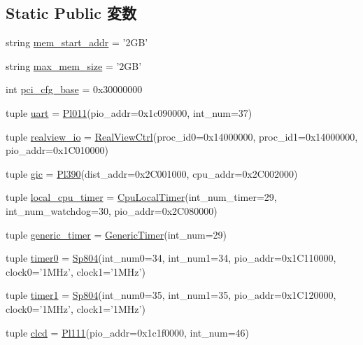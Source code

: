 \subsection*{Static Public 変数}
\begin{DoxyCompactItemize}
\item 
string \hyperlink{classRealView_1_1VExpress__EMM_a36ef458632b618b443f831f05ce3296e}{mem\_\-start\_\-addr} = '2GB'
\item 
string \hyperlink{classRealView_1_1VExpress__EMM_ad117287c3578a335336372971d237cce}{max\_\-mem\_\-size} = '2GB'
\item 
int \hyperlink{classRealView_1_1VExpress__EMM_a414ad47615ab498f1da72365f610ff63}{pci\_\-cfg\_\-base} = 0x30000000
\item 
tuple \hyperlink{classRealView_1_1VExpress__EMM_a1f69fbabd17d6bca63f97f9754247cfd}{uart} = \hyperlink{classRealView_1_1Pl011}{Pl011}(pio\_\-addr=0x1c090000, int\_\-num=37)
\item 
tuple \hyperlink{classRealView_1_1VExpress__EMM_a54d7e0216558aeb12a980d61e36094da}{realview\_\-io} = \hyperlink{classRealView_1_1RealViewCtrl}{RealViewCtrl}(proc\_\-id0=0x14000000, proc\_\-id1=0x14000000, pio\_\-addr=0x1C010000)
\item 
tuple \hyperlink{classRealView_1_1VExpress__EMM_a40243beb62d217c3a9e35801ae739fd0}{gic} = \hyperlink{classPl390}{Pl390}(dist\_\-addr=0x2C001000, cpu\_\-addr=0x2C002000)
\item 
tuple \hyperlink{classRealView_1_1VExpress__EMM_a4fac58dbb9d72c639bc0d5836e2e1252}{local\_\-cpu\_\-timer} = \hyperlink{classRealView_1_1CpuLocalTimer}{CpuLocalTimer}(int\_\-num\_\-timer=29, int\_\-num\_\-watchdog=30, pio\_\-addr=0x2C080000)
\item 
tuple \hyperlink{classRealView_1_1VExpress__EMM_a52191b117ee0056fa00602ded59a5838}{generic\_\-timer} = \hyperlink{classRealView_1_1GenericTimer}{GenericTimer}(int\_\-num=29)
\item 
tuple \hyperlink{classRealView_1_1VExpress__EMM_af4ebf9ec12f4c51e9fd2eee3647a3932}{timer0} = \hyperlink{classRealView_1_1Sp804}{Sp804}(int\_\-num0=34, int\_\-num1=34, pio\_\-addr=0x1C110000, clock0='1MHz', clock1='1MHz')
\item 
tuple \hyperlink{classRealView_1_1VExpress__EMM_a43a269dacabf237422bf29f79e52a7e5}{timer1} = \hyperlink{classRealView_1_1Sp804}{Sp804}(int\_\-num0=35, int\_\-num1=35, pio\_\-addr=0x1C120000, clock0='1MHz', clock1='1MHz')
\item 
tuple \hyperlink{classRealView_1_1VExpress__EMM_aca2e883cdc9c636e4500344d5892f6c9}{clcd} = \hyperlink{classRealView_1_1Pl111}{Pl111}(pio\_\-addr=0x1c1f0000, int\_\-num=46)

\end{DoxyCompactItemize}
